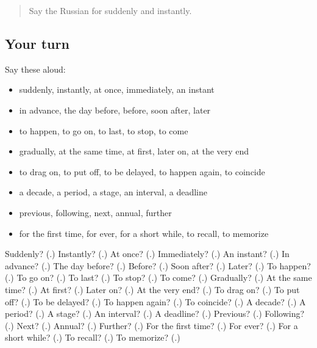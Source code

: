 \begin{quote}
Say the Russian for suddenly and instantly.
\end{quote}

\subsection*{Your turn}
Say these aloud:

\begin{itemize}
\raggedright
  \item suddenly, instantly, at once, immediately, an instant
  \item in advance, the day before, before, soon after, later
  \item to happen, to go on, to last, to stop, to come
  \item gradually, at the same time, at first, later on, at the very end
  \item to drag on, to put off, to be delayed, to happen again, to coincide
  \item a decade, a period, a stage, an interval, a deadline
  \item previous, following, next, annual, further
  \item for the first time, for ever, for a short while, to recall, to memorize
\end{itemize}

\begin{tcolorbox}[breakable,colback=teal!4,colframe=teal!35!black,title={Before you move on}]
Suddenly? (\textbf{}.) Instantly? (\textbf{}.) At once? (\textbf{}.) Immediately? (\textbf{}.) An instant? (\textbf{}.) In advance? (\textbf{}.) The day before? (\textbf{}.) Before? (\textbf{}.) Soon after? (\textbf{}.) Later? (\textbf{}.) To happen? (\textbf{}.) To go on? (\textbf{}.) To last? (\textbf{}.) To stop? (\textbf{}.) To come? (\textbf{}.) Gradually? (\textbf{}.) At the same time? (\textbf{}.) At first? (\textbf{}.) Later on? (\textbf{}.) At the very end? (\textbf{}.) To drag on? (\textbf{}.) To put off? (\textbf{}.) To be delayed? (\textbf{}.) To happen again? (\textbf{}.) To coincide? (\textbf{}.) A decade? (\textbf{}.) A period? (\textbf{}.) A stage? (\textbf{}.) An interval? (\textbf{}.) A deadline? (\textbf{}.) Previous? (\textbf{}.) Following? (\textbf{}.) Next? (\textbf{}.) Annual? (\textbf{}.) Further? (\textbf{}.) For the first time? (\textbf{}.) For ever? (\textbf{}.) For a short while? (\textbf{}.) To recall? (\textbf{}.) To memorize? (\textbf{}.)
\end{tcolorbox}
